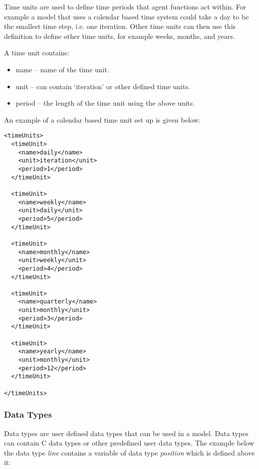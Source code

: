 Time units are used to define time periods that agent functions act within. For
example a model that uses a calendar based time system could take a day to be
the smallest time step, i.e. one iteration. Other time units can then use this
definition to define other time units, for example weeks, months, and years.

A time unit contains:

\begin{itemize}
\item name -- name of the time unit.
\item unit -- can contain `iteration' or other defined time units.
\item period -- the length of the time unit using the above units.
\end{itemize}

An example of a calendar based time unit set up is given below:

\begin{mylisting}
\begin{verbatim}
<timeUnits>
  <timeUnit>
    <name>daily</name>
    <unit>iteration</unit>
    <period>1</period>
  </timeUnit>

  <timeUnit>
    <name>weekly</name>
    <unit>daily</unit>
    <period>5</period>
  </timeUnit>

  <timeUnit>
    <name>monthly</name>
    <unit>weekly</unit>
    <period>4</period>
  </timeUnit>

  <timeUnit>
    <name>quarterly</name>
    <unit>monthly</unit>
    <period>3</period>
  </timeUnit>

  <timeUnit>
    <name>yearly</name>
    <unit>monthly</unit>
    <period>12</period>
  </timeUnit>

</timeUnits>
\end{verbatim}
\end{mylisting}

\subsubsection{Data Types}

Data types are user defined data types that can be used in a model.
Data types can contain C data types or other predefined user data types.
The example below the data type \emph{line} contains a variable
of data type \emph{position} which is defined above it:

